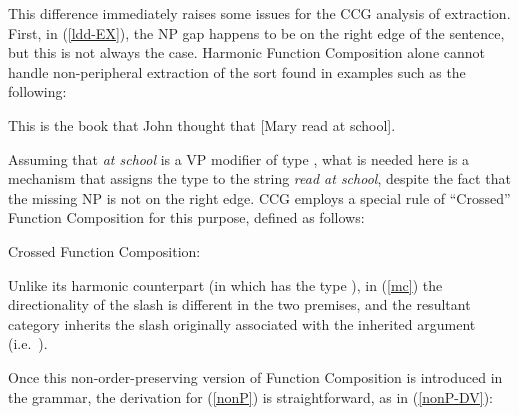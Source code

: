 \documentclass[output=paper
                ,modfonts
 	        ,biblatex
                ,babelshorthands
                ,newtxmath
                ,draftmode
                ,colorlinks, citecolor=brown
]{langscibook}
\begin{document}
This difference immediately raises some issues for the CCG analysis of
extraction. First, in (\ref{ldd-EX}), the NP gap happens to be on the right
edge of the sentence, but this is not always the  case. Harmonic
Function Composition alone cannot  handle non-peripheral
extraction of the sort found in examples such as the following:

\begin{exe}
 \ex\label{nonP}
  This is the book that John thought that [Mary read {\trace}\xspace at school].
\end{exe}
Assuming that  \textit{at school} is a VP modifier of type ,
what is needed here is a mechanism that assigns the type 
to the string \textit{read {\trace}\xspace at school}, despite the
fact that  the missing NP is not  
on the right edge. CCG employs a special  rule of ``Crossed'' Function
Composition for this purpose, defined as follows:

\begin{exe}
 \ex\label{mc}
Crossed Function Composition:\\[.5\baselineskip]
\attop{\begin{prooftree}
\hypo{\LexEnt{\pt{\ptv{a}}}{\sem{ \sG}}{\syncat{\textit{A}\ensuremath{/}\textit{B}}}}
\hypo{\LexEnt{\pt{\ptv{b}}}{\sem{ \sF}}{\syncat{\textit{A}\ensuremath{\backslash}{}\textit{C}}}}
\infer2[xFC]{\LexEnt{\pt{\ptv{a} \ensuremath{\circ}\xspace \ptv{b}}}{\sem{ \lambda x. \sF(\sG(x))}}{\syncat{\textit{C}\ensuremath{/}\textit{B}}}}
\end{prooftree}}
\end{exe}
Unlike its harmonic counterpart (in which  has the type
), in (\ref{mc})
the directionality of the slash is different 
in the two premises, and the resultant category inherits the
slash originally associated with the inherited argument 
(i.e.\ ).

Once this non-order-preserving version of Function Composition is 
introduced in the grammar, the derivation for (\ref{nonP}) is
straightforward, as in (\ref{nonP-DV}):
\end{document}
